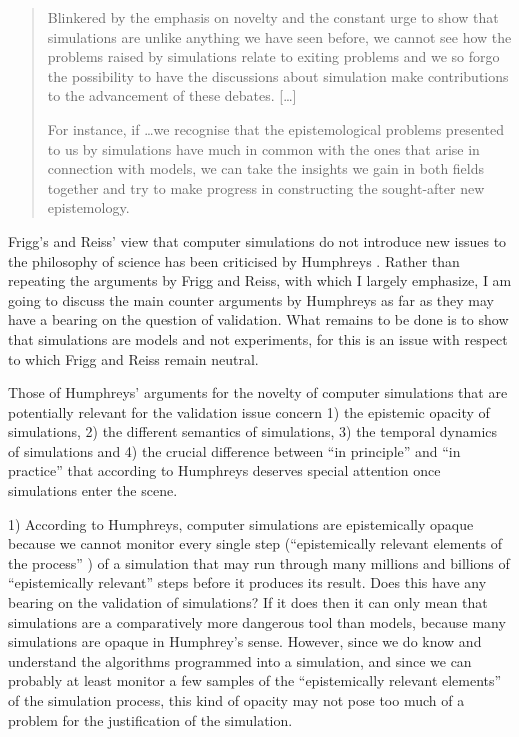 \documentclass[onecollarge]{STJour}
\numberwithin{equation}{section}
\begin{document}
\begin{quote}

Blinkered by the emphasis on novelty and the constant urge to show that
simulations are unlike anything we have seen before, we cannot see how
the problems raised by simulations relate to exiting problems and we so
forgo the possibility to have the discussions about simulation make
contributions to the advancement of these debates. [\ldots]

For instance, if \ldots we recognise that the epistemological problems
presented to us by simulations have much in common with the ones that
arise in connection with models, we can take the insights we gain in both
fields together and try to make progress in constructing the sought-after
new epistemology. \citep[p.\ 611]{frigg-reiss:2009}

\end{quote}

Frigg's and Reiss' view that computer simulations do not introduce new
issues to the philosophy of science has been criticised by Humphreys
\citeyearpar{humphreys:2009}. Rather than repeating the arguments by
Frigg and Reiss, with which I largely emphasize, I am going to discuss the main
counter arguments by Humphreys as far as they may have a bearing on the
question of validation. What remains to be done is to show that
simulations are models and not experiments, for this is an issue with
respect to which Frigg and Reiss remain neutral.
 
Those of Humphreys' arguments for the novelty of computer simulations
that are potentially relevant for the validation issue concern 1) the
epistemic opacity of simulations, 2) the different semantics of
simulations, 3) the temporal dynamics of simulations and 4) the crucial
difference between ``in principle'' and ``in practice'' that according
to Humphreys deserves special attention once simulations enter the scene.

1) According to Humphreys, computer simulations are epistemically opaque
because we cannot monitor every single step (``epistemically relevant
elements of the process'' \citep[p.\ 618]{humphreys:2009}) of a
simulation that may run through many millions and billions of
``epistemically relevant'' steps before it produces its result. Does this
have any bearing on the validation of simulations? If it does then it can
only mean that simulations are a comparatively more dangerous tool than
models, because many simulations are opaque in Humphrey's sense. However,
since we do know and understand the algorithms programmed into a
simulation, and since we can probably at least monitor a few samples of
the ``epistemically relevant elements'' of the simulation process, this
kind of opacity may not pose too much of a problem for the justification
of the simulation.
\end{document}
